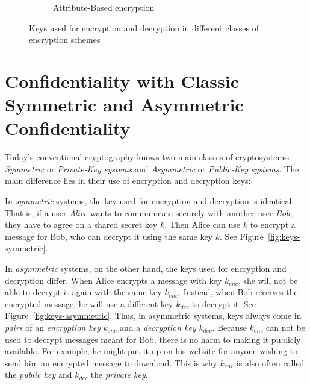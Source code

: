 \begin{figure}
\begin{subfigure}{.7\textwidth}
        \caption{Attribute-Based encryption} \label{fig:keys-abe}
    \end{subfigure}
    \caption[Keys in different classes of encryption schemes]{Keys used for encryption and decryption in different classes of encryption schemes}
\end{figure}

\section{Confidentiality with Classic Symmetric and Asymmetric Confidentiality}
Today's conventional cryptography knows two main classes of cryptosystems: \emph{Symmetric} or \emph{Private-Key systems} and \emph{Asymmetric} or \emph{Public-Key systems}.
The main difference lies in their use of encryption and decryption keys:

In \emph{symmetric} systems, the key used for encryption and decryption is identical.
That is, if a user \emph{Alice} wants to communicate securely with another user \emph{Bob}, they have to agree on a shared secret key $k$.
Then Alice can use $k$ to encrypt a message for Bob, who can decrypt it using the same key $k$. See Figure~\ref{fig:keys-symmetric}.

In \emph{asymmetric} systems, on the other hand, the keys used for encryption and decryption differ.
When Alice encrypts a message with key $k_{enc}$, she will not be able to decrypt it again with the same key $k_{enc}$.
Instead, when Bob receives the encrypted message, he will use a different key $k_{dec}$ to decrypt it. See Figure~\ref{fig:keys-asymmetric}.
Thus, in asymmetric systems, keys always come in \emph{pairs} of an \emph{encryption key} $k_{enc}$ and a \emph{decryption key} $k_{dec}$.
Because $k_{enc}$ can not be used to decrypt messages meant for Bob, there is no harm to making it publicly available.
For example, he might put it up on his website for anyone wishing to send him an encrypted message to download. This is why $k_{enc}$ is also often called the \emph{public key} and $k_{dec}$ the \emph{private key}.

